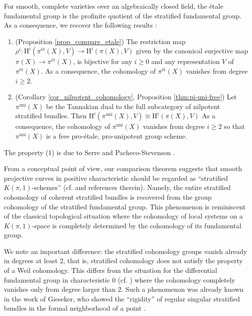 \documentclass[12pt,a4]{amsart}
\theoremstyle{definition}
\begin{document}
For smooth, complete varieties over an algebraically closed field, 
the \'etale fundamental group is the profinite quotient of the stratified fundamental 
group.  As a consequence, we recover the following results :
\begin{enumerate}
\item (Proposition \ref{prop_compare_etale}) 
The restriction map $\rho^i:\mathrm{H}^i(\pi^\text{\'et}(X),V)\longrightarrow 
\mathrm{H}^i(\pi(X),V)$ given by the canonical surjective map 
$\pi(X)\longrightarrow \pi^\text{\'et}(X)$, is
bijective for any $i\geq 0$ and any representation $V$ of $\pi^\text{\'et}(X)$.
As a consequence, the cohomology of $\pi^\text{\'et}(X)$ vanishes from degree $i\geq 2$.
\item (Corollary
\ref{cor_nilpotent_cohomology}, Proposition \ref{thm:pi-uni-free})
Let $\pi^\mathrm{uni}(X)$ be the Tannakian dual to the full subcategory of nilpotent
stratified bundles. Then $\mathrm H^i(\pi^\mathrm{uni}(X),V)\cong\mathrm  H^i(\pi(X),V)$
As a consequence, the cohomology of $\pi^\mathrm{uni}(X)$ vanishes from degree $i\geq 2$
so that $\pi^\mathrm{uni}(X)$ is a free pro-\'etale, pro-unipotent group scheme.
\end{enumerate}
The property (1) is due to Serre \cite{Ser90} and Pacheco-Stevenson \cite{PS00}. 


 From a conceptual point of view, our comparison theorem suggests that smooth projective curves in positive characteristic should be regarded as ``stratified \(K(\pi,1)\)-schemes''
(cf. \cite{BHT25,HBB26, BN26} and references therein). Namely, the entire stratified cohomology of coherent stratified bundles is recovered from the group cohomology of the stratified fundamental group. This phenomenon is reminiscent of the classical topological situation where the cohomology of local systems on a \(K(\pi,1)\)-space is completely determined by the cohomology of its fundamental group.

We note an important difference: the stratified cohomology groups vanish already in degrees at least \(2\), that is, stratified cohomology does
not satisfy the property of a Weil cohomology.
This differs from the situation for the differential fundamental group in characteristic \(0\) (cf.
\cite{BHT25}) where the cohomology completely vanishes only from degree larger than 2. 
Such a phenomenon was already known in the work of Gieseker, who showed the ``rigidity'' 
of regular singular stratified bundles in the formal neighborhood of a point 
\cite[Theorem~3.3]{Gie75}.
\end{document}
